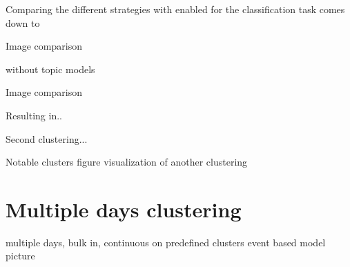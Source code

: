   Comparing the different strategies with \lsa{} enabled for the classification task comes down to 

    Image comparison

  without topic models

    Image comparison

  Resulting in..

  Second clustering...

    Notable clusters figure
    visualization of another clustering

\section{Multiple days clustering}
  
  multiple days, bulk in,
  continuous on predefined clusters
  event based model picture

